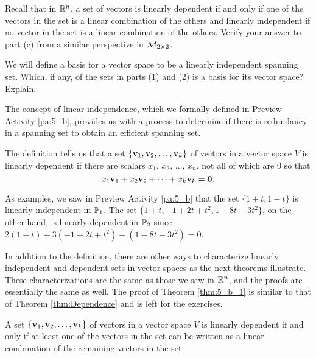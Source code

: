 \begin{pa}
\item Recall that in $\mathbb{R}^n$, a set of vectors is linearly dependent if and only if one of the vectors in the set is a linear combination of the others and linearly independent if no vector in the set is a linear combination of the others. Verify your answer to part (c) from a similar perspective in $\mathcal{M}_{2 \times 2}$.
 	
	\ea
	
	
\item We will define a basis for a vector space to be a linearly independent spanning set. Which, if any, of the sets in parts (1) and (2) is a basis for its vector space? Explain. 

\ee

\end{pa}


The concept of linear independence, which we formally defined in Preview Activity \ref{pa:5_b}, provides us with a process to determine if there is redundancy in a spanning set to obtain an efficient spanning set. 


The definition tells us that a set $\{\mathbf{v}_1, \mathbf{v}_2, \ldots, \mathbf{v}_k\}$ of vectors in a vector space $V$ is linearly dependent if there are scalars $x_1$, $x_2$, $\ldots$, $x_n$, not all of which are 0 so that
\[x_1 \mathbf{v}_1 + x_2 \mathbf{v}_2 + \cdots + x_k \mathbf{v}_k = \mathbf{0}.\]

As examples, we saw in Preview Activity \ref{pa:5_b} that the set $\{1+t, 1-t\}$ is linearly independent in $\mathbb{P}_1$. The set $\{1+t, -1+2t+t^2, 1-8t-3t^2\}$, on the other hand, is linearly dependent in $\mathbb{P}_2$ since $2(1+t) + 3(-1+2t+t^2) + (1-8t-3t^2) = 0$.  

In addition to the definition, there are other ways to characterize linearly independent and dependent sets in vector spaces as the next theorems illustrate. These characterizations are the same as those we saw in $\mathbb{R}^n$, and the proofs are essentially the same as well. The proof of Theorem \ref{thm:5_b_1} is similar to that of Theorem \ref{thm:Dependence} and is left for the exercises. 

\begin{theorem} \label{thm:5_b_1} A set $\{\mathbf{v}_1, \mathbf{v}_2, \ldots, \mathbf{v}_k\}$ of vectors in a vector space $V$ is linearly dependent if and only if at least one of the vectors in the set can be written as a linear combination of the remaining vectors in the set.
\end{theorem}

